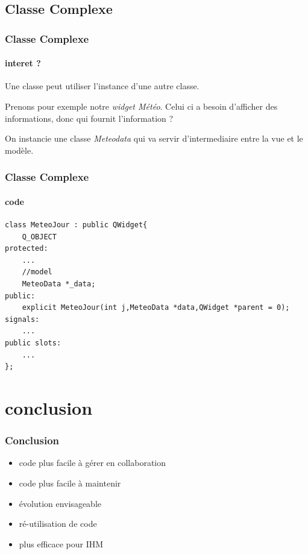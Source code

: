 \documentclass[10pt]{beamer}
\begin{document}
  \subsection{Classe Complexe}
\begin{frame}
  \frametitle{Classe Complexe}
  \framesubtitle{interet ?}

  Une classe peut utiliser l'instance d'une autre classe.\\

  Prenons pour exemple notre \emph{widget Météo}. Celui ci a besoin d'afficher des informations, donc qui fournit l'information ?

  On instancie une classe \emph{Meteodata} qui va servir d'intermediaire entre la vue et le modèle.
\end{frame}

\begin{frame}[fragile]
  \frametitle{Classe Complexe}
  \framesubtitle{code}
  \begin{verbatim}
class MeteoJour : public QWidget{
    Q_OBJECT
protected:
    ...
    //model
    MeteoData *_data;
public:
    explicit MeteoJour(int j,MeteoData *data,QWidget *parent = 0);
signals:
    ...
public slots:
    ...
};
  \end{verbatim}
\end{frame}

\section{conclusion}
\begin{frame}
\frametitle{Conclusion}
  \begin{itemize}
    \item code plus facile à gérer en collaboration
    \item code plus facile à maintenir
    \item évolution envisageable
    \item ré-utilisation de code
    \item plus efficace pour IHM
  \end{itemize}
\end{frame}
\end{document}
